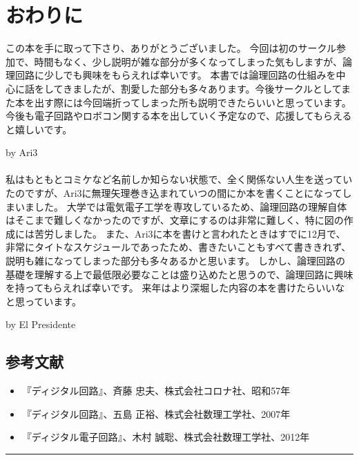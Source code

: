 \chapter{おわりに}

この本を手に取って下さり、ありがとうございました。
今回は初のサークル参加で、時間もなく、少し説明が雑な部分が多くなってしまった気もしますが、論理回路に少しでも興味をもらえれば幸いです。
本書では論理回路の仕組みを中心に話をしてきましたが、割愛した部分も多々あります。今後サークルとしてまた本を出す際には今回端折ってしまった所も説明できたらいいと思っています。
今後も電子回路やロボコン関する本を出していく予定なので、応援してもらえると嬉しいです。

by \quad Ari3
\\
\\

私はもともとコミケなど名前しか知らない状態で、全く関係ない人生を送っていたのですが、Ari3に無理矢理巻き込まれていつの間にか本を書くことになってしまいました。
大学では電気電子工学を専攻しているため、論理回路の理解自体はそこまで難しくなかったのですが、文章にするのは非常に難しく、特に図の作成には苦労しました。
また、Ari3に本を書けと言われたときはすでに12月で、非常にタイトなスケジュールであったため、書きたいこともすべて書ききれず、説明も雑になってしまった部分も多々あるかと思います。
しかし、論理回路の基礎を理解する上で最低限必要なことは盛り込めたと思うので、論理回路に興味を持ってもらえれば幸いです。
来年はより深堀した内容の本を書けたらいいなと思っています。

by \quad El Presidente


\section*{参考文献}
\begin{itemize}
    \item 『ディジタル回路』、斉藤 忠夫、株式会社コロナ社、昭和57年
    \item 『ディジタル回路』、五島 正裕、株式会社数理工学社、2007年
    \item 『ディジタル電子回路』、木村 誠聡、株式会社数理工学社、2012年
\end{itemize}

\newpage
\thispagestyle{empty}

\vspace*{\fill}

\vspace{15em}

\noindent\rule{\textwidth}{0.4pt}

